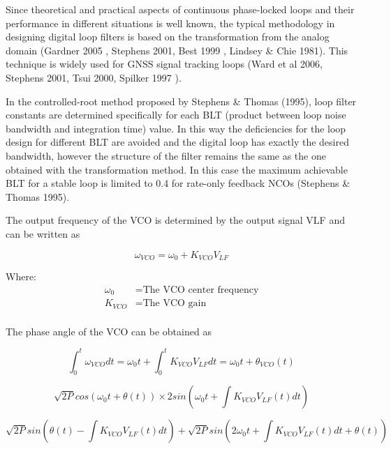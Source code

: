 Since theoretical and practical aspects of continuous phase-locked loops and their performance in different situations is well known, the typical methodology in designing digital loop filters is based on the transformation from the analog domain (Gardner 2005 \cite{Gardner}, Stephens 2001\cite{Stephens}, Best 1999 \cite{Best}, Lindsey \& Chie 1981)\cite{Lindsey}. This technique is widely used for GNSS signal tracking loops (Ward et al 2006\cite{Ward}, Stephens 2001\cite{Stephens}, Tsui 2000\cite{Tsui}, Spilker 1997 \cite{Spilker}).


In the controlled-root method proposed by Stephens \& Thomas (1995), loop filter constants are determined specifically for each BLT (product between loop noise bandwidth and integration time) value. In this way the deficiencies for the loop design for different BLT are avoided and the digital loop has exactly the desired bandwidth, however the structure of the filter remains the same as the one obtained with the transformation method. In this case the maximum achievable BLT for a stable loop is limited to 0.4 for rate-only feedback NCOs (Stephens \& Thomas 1995).

The output frequency of the VCO is determined by the output signal VLF and can be written as

\begin{equation}
	\omega_{VCO} = \omega_0 + K_{VCO}V_{LF}
\end{equation}

Where:
\begin{align*}
	\omega_0 &= \text{The VCO center frequency}\\
	K_{VCO} &= \text{The VCO gain}\\
\end{align*}

The phase angle of the VCO can be obtained as 

\begin{equation}
	\int_{0}^{t} \omega_{VCO}dt = \omega_0t + \int_{0}^{t} K_{VCO}V_{LF} dt = \omega_0t + \theta_{VCO}(t) 
\end{equation}

\begin{equation}
\sqrt{2P} cos(\omega_0t + \theta(t)) \times 2sin(\omega_0t + \int K_{VCO} V_{LF}(t)dt)	
\end{equation}

\begin{equation}
\sqrt{2P} sin(\theta(t) - \int K_{VCO}V_{LF}(t) dt) + \sqrt{2P} sin(2\omega_0 t + \int K_{VCO} V_{LF}(t)dt + \theta(t))	
\end{equation}

